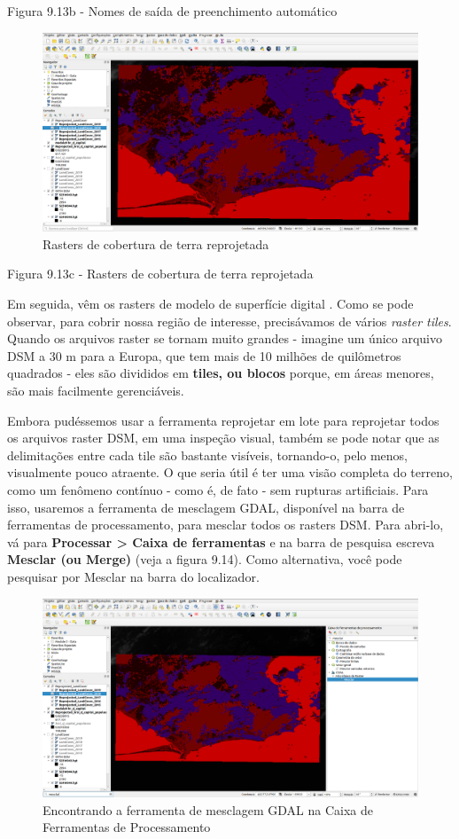 \documentclass[
  portuguese,
]{krantz}
\begin{document}
Figura 9.13b - Nomes de saída de preenchimento automático

\begin{figure}
\centering
\includegraphics{media/modulo9/fig913_c.png}
\caption{Rasters de cobertura de terra reprojetada}
\end{figure}

Figura 9.13c - Rasters de cobertura de terra reprojetada

Em seguida, vêm os rasters de modelo de superfície digital . Como se pode observar, para cobrir nossa região de interesse, precisávamos de vários \emph{raster tiles}. Quando os arquivos raster se tornam muito grandes - imagine um único arquivo DSM a 30 m para a Europa, que tem mais de 10 milhões de quilômetros quadrados - eles são divididos em \textbf{tiles, ou blocos} porque, em áreas menores, são mais facilmente gerenciáveis.

Embora pudéssemos usar a ferramenta reprojetar em lote para reprojetar todos os arquivos raster DSM, em uma inspeção visual, também se pode notar que as delimitações entre cada tile são bastante visíveis, tornando-o, pelo menos, visualmente pouco atraente. O que seria útil é ter uma visão completa do terreno, como um fenômeno contínuo - como é, de fato - sem rupturas artificiais. Para isso, usaremos a ferramenta de mesclagem GDAL, disponível na barra de ferramentas de processamento, para mesclar todos os rasters DSM. Para abri-lo, vá para \textbf{Processar \textgreater{} Caixa de ferramentas } e na barra de pesquisa escreva \textbf{Mesclar (ou Merge)} (veja a figura 9.14). Como alternativa, você pode pesquisar por Mesclar na barra do localizador.

\begin{figure}
\centering
\includegraphics{media/modulo9/fig914.png}
\caption{Encontrando a ferramenta de mesclagem GDAL na Caixa de Ferramentas de Processamento}
\end{figure}
\end{document}
